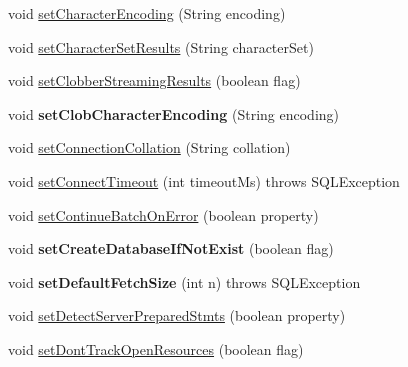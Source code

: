 \begin{DoxyCompactItemize}
\item 
void \mbox{\hyperlink{interfacecom_1_1mysql_1_1jdbc_1_1_connection_properties_ac5db9f2921918f0a5d1f55ce5e093948}{set\+Character\+Encoding}} (String encoding)
\item 
void \mbox{\hyperlink{interfacecom_1_1mysql_1_1jdbc_1_1_connection_properties_a8279ffd124fca779625e5d1d94f32c56}{set\+Character\+Set\+Results}} (String character\+Set)
\item 
void \mbox{\hyperlink{interfacecom_1_1mysql_1_1jdbc_1_1_connection_properties_a3bb976fbcde1b60e4dae84b49320de5f}{set\+Clobber\+Streaming\+Results}} (boolean flag)
\item 
\mbox{\label{interfacecom_1_1mysql_1_1jdbc_1_1_connection_properties_a254eba3b0128843f03906637427cc2a8}} 
void {\bfseries set\+Clob\+Character\+Encoding} (String encoding)
\item 
void \mbox{\hyperlink{interfacecom_1_1mysql_1_1jdbc_1_1_connection_properties_a69729667beed7cc9989d0b736d2cc28d}{set\+Connection\+Collation}} (String collation)
\item 
void \mbox{\hyperlink{interfacecom_1_1mysql_1_1jdbc_1_1_connection_properties_af58263721d45c09ec3bdbccc1041e1df}{set\+Connect\+Timeout}} (int timeout\+Ms)  throws S\+Q\+L\+Exception
\item 
void \mbox{\hyperlink{interfacecom_1_1mysql_1_1jdbc_1_1_connection_properties_a5f3f94fedf8c3162e2b825279a9d01ed}{set\+Continue\+Batch\+On\+Error}} (boolean property)
\item 
\mbox{\label{interfacecom_1_1mysql_1_1jdbc_1_1_connection_properties_a98d27ea223972068dab452a7f3eadc0a}} 
void {\bfseries set\+Create\+Database\+If\+Not\+Exist} (boolean flag)
\item 
\mbox{\label{interfacecom_1_1mysql_1_1jdbc_1_1_connection_properties_a60f91d02e9aff577eb51b6262f6d0164}} 
void {\bfseries set\+Default\+Fetch\+Size} (int n)  throws S\+Q\+L\+Exception
\item 
void \mbox{\hyperlink{interfacecom_1_1mysql_1_1jdbc_1_1_connection_properties_aadfec3198248406f73aea1a634fc3839}{set\+Detect\+Server\+Prepared\+Stmts}} (boolean property)
\item 
void \mbox{\hyperlink{interfacecom_1_1mysql_1_1jdbc_1_1_connection_properties_a71698dd42306aa0d570cda6344bc8680}{set\+Dont\+Track\+Open\+Resources}} (boolean flag)

\end{DoxyCompactItemize}
